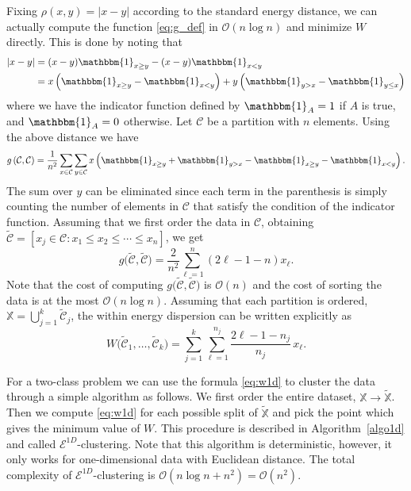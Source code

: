 \documentclass[aps,preprint,nofootinbib,floatfix]{revtex4-1}
\newcommand\C{{\mathcal{C}}}
\newcommand\tC{{\widetilde{\C}}}
\newcommand\OO{{\mathcal{O}}}
\newcommand{\Ind}[1]{\mathbbm{1}_{#1}}
\begin{document}
Fixing
$\rho(x,y) = |x - y|$ according to the standard energy distance, we can 
actually compute the function
\eqref{eq:g_def} in $\OO(n \log n)$ and minimize
$W$ directly.
This is done by noting that
\begin{equation}
\begin{aligned}
|x - y|  &= (x-y)\Ind{x \ge y} -
(x-y) \Ind{x < y}  \\
&= 
x \left( \Ind{x \ge y} - \Ind{x < y} \right)  + 
y \left( \Ind{y > x} - \Ind{y \le x} \right)  
\end{aligned}
\end{equation}
where we have the indicator function defined by 
$\Ind{A}=1$ if $A$ is true, and $\Ind{A}=0$ otherwise. 
Let $\C$ be a partition with
$n$ elements. Using the above distance we have
\begin{equation}
\label{eq:g_ind}
g\left(\C,\C\right) = \dfrac{1}{n^2} \sum_{x \in \C} 
\sum_{y \in \C} 
x \left(
\Ind{x \ge y} + \Ind{y > x} - 
\Ind{x \ge y}-\Ind{x < y} \right) .
\end{equation}
The sum over $y$ can be eliminated since each term in
the parenthesis is simply counting the number of elements in $\C$ that satisfy
the condition of the indicator function. Assuming
that we first order the data in $\C$, obtaining
$\tC = [ x_j \in \C: x_1 \le x_2 \le \dotsm \le x_{n}]$, we
get 
\begin{equation}
\label{eq:g1d}
g\big(\tC, \tC \big) = 
\dfrac{2}{n^2} \sum_{\ell=1}^n (2\ell - 1 - n) x_\ell .
\end{equation}
Note that the cost of computing 
$g\big( \tC, \tC \big)$
is $\OO(n)$ and the cost of
sorting the data
is at the most $\OO(n\log n)$.
Assuming that each partition is ordered,  
$\mathbb{X} = \bigcup_{j=1}^k \tC_j$,
the within energy dispersion
can be written explicitly as
\begin{equation}
\label{eq:w1d}
W\big( \tC_1,\dotsc,\tC_k \big) = 
\sum_{j=1}^k \sum_{\ell=1}^{n_j} \dfrac{2\ell - 1 - n_j}{n_j} \, x_\ell.
\end{equation}

For a two-class problem we can use the formula
\eqref{eq:w1d} to cluster the data
through a simple algorithm 
as follows. We first order
the entire dataset, $\mathbb{X} \to \widetilde{\mathbb{X}}$. Then 
we compute \eqref{eq:w1d} for each possible split of $\widetilde{\mathbb{X}}$
and pick the point which gives the minimum value of $W$.
This procedure is described in Algorithm~\ref{algo1d} and called
$\mathcal{E}^{1D}$-clustering.
Note that this algorithm is deterministic,
however,
it only works for one-dimensional data with Euclidean distance. The total
complexity of $\mathcal{E}^{1D}$-clustering is $\OO(n\log n + n^2) = \OO(n^2)$.
\end{document}
